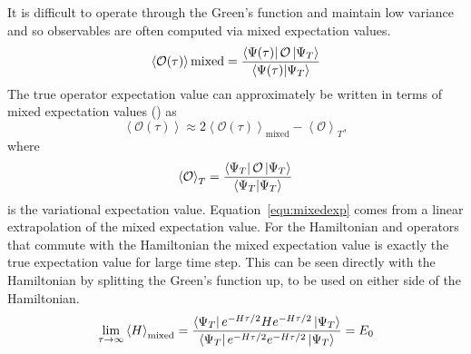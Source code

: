 It is difficult to operate through the Green's function and maintain low variance and so observables are often computed via mixed expectation values.
\begin{equation}
   \left<\mathcal{O(\tau)}\right>\text{mixed} = \frac{\left< \Psi(\tau) \right|\mathcal{O}\left| \Psi_T \right>}{\left< \Psi(\tau) | \Psi_T \right>}
\end{equation}
The true operator expectation value can approximately be written in terms of mixed expectation values (\cite{pudliner1997}) as
\begin{equation}
   \left<\mathcal{O(\tau)}\right> \approx 2\left<\mathcal{O(\tau)}\right>_\text{mixed} - \left<\mathcal{O}\right>_T,
   \label{equ:mixedexp}
\end{equation}
where
\begin{equation}
   \left<\mathcal{O}\right>_T = \frac{\left< \Psi_T \right|\mathcal{O}\left| \Psi_T \right>}{\left< \Psi_T | \Psi_T \right>}
\end{equation}
is the variational expectation value. Equation~\ref{equ:mixedexp} comes from a linear extrapolation of the mixed expectation value. For the Hamiltonian and operators that commute with the Hamiltonian the mixed expectation value is exactly the true expectation value for large time step. This can be seen directly with the Hamiltonian by splitting the Green's function up, to be used on either side of the Hamiltonian.
\begin{equation}
   \lim\limits_{\tau\rightarrow\infty}\left<H\right>_\text{mixed} = \frac{\left< \Psi_T \right|e^{-H\tau/2}He^{-H\tau/2}\left| \Psi_T \right>}{\left< \Psi_T \right|e^{-H\tau/2}e^{-H\tau/2}\left| \Psi_T \right>} = E_0
\end{equation}

